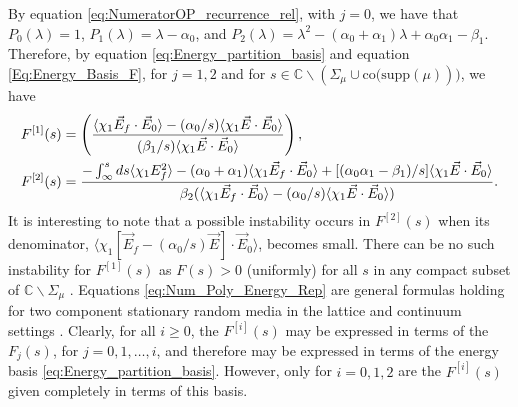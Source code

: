 \documentclass[english,12pt]{ttuthes}
\begin{document}
By equation \eqref{eq:NumeratorOP_recurrence_rel},
with $j=0$, we have that $P_0(\lambda)=1$, $P_1(\lambda)=\lambda-\alpha_0$, and
$P_2(\lambda)=\lambda^2-(\alpha_0+\alpha_1)\lambda+\alpha_0\alpha_1-\beta_1$. Therefore, by equation
\eqref{eq:Energy_partition_basis} and equation
\eqref{Eq:Energy_Basis_F}, for $j=1,2$ and for
$s\in\mathbb{C}\backslash(\Sigma_\mu\cup\text{co(supp}(\mu)))$, we have 
%
\begin{align}\label{eq:Num_Poly_Energy_Rep}
 F^{[1]}(s)&=
    \left(
      \frac{\langle\chi_1\vec{E}_f\cdot\vec{E}_0\rangle-(\alpha_0/s)\langle\chi_1\vec{E}\cdot\vec{E}_0\rangle}
           {(\beta_1/s)\langle\chi_1\vec{E}\cdot\vec{E}_0\rangle}
    \right),\\
 F^{[2]}(s)&=
    \frac{-\int_\infty^sds\langle\chi_1E_f^2\rangle-(\alpha_0+\alpha_1)\langle\chi_1\vec{E}_f\cdot\vec{E}_0\rangle
            +[(\alpha_0\alpha_1-\beta_1)/s]\langle\chi_1\vec{E}\cdot\vec{E}_0\rangle}
          {\beta_2(\langle\chi_1\vec{E}_f \cdot\vec{E}_0\rangle -(\alpha_0/s)\langle\chi_1\vec{E}\cdot\vec{E}_0\rangle)}.
          \notag
\end{align}
%
It is interesting to note that a possible instability occurs in $F^{[2]}(s)$
when its denominator, $\langle\chi_1[\vec{E}_f -(\alpha_0/s)\vec{E}] \cdot\vec{E}_0\rangle$,
becomes small. There can be no such instability for $F^{[1]}(s)$ as
$F(s)>0$ (uniformly) for all $s$ in any compact subset of
$\mathbb{C}\backslash\Sigma_\mu$ \cite{Golden:CMP-473}. Equations
\eqref{eq:Num_Poly_Energy_Rep} are general formulas holding for two
component stationary random media in the lattice and continuum
settings \cite{Golden:PRL-3935}. Clearly, for all $i\geq0$, the
$F^{[i]}(s)$ may be expressed in terms of the $F_j(s)$, for
$j=0,1,\ldots,i$, and therefore may be expressed in terms of the energy
basis \eqref{eq:Energy_partition_basis}. However, only for $i=0,1,2$
are the $F^{[i]}(s)$ given completely in terms of this basis. 
%
\end{document}
